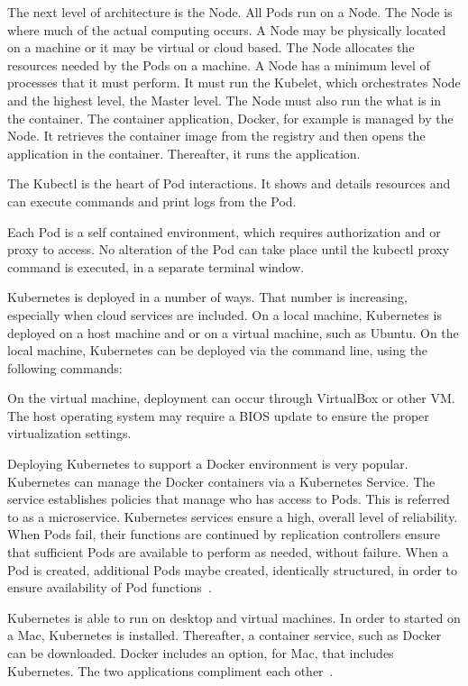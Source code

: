 The next level of architecture is the Node.  All Pods run on a Node.
The Node is where much of the actual computing occurs.  A Node may be
physically located on a machine or it may be virtual or cloud
based. The Node allocates the resources needed by the Pods on a
machine.  A Node has a minimum level of processes that it must
perform.  It must run the Kubelet, which orchestrates Node and the
highest level, the Master level.  The Node must also run the what is
in the container.  The container application, Docker, for example is
managed by the Node.  It retrieves the container image from the
registry and then opens the application in the container.  Thereafter,
it runs the application. 

The Kubectl is the heart of Pod interactions.  It shows and details
resources and can execute commands and print logs from the Pod. 

Each Pod is a self contained environment, which requires authorization
and or proxy to access.  No alteration of the Pod can take place until
the kubectl proxy command is executed, in a separate terminal window.   
 


Kubernetes is deployed in a number of ways.  That number is
increasing, especially when cloud services are included.  On a local
machine, Kubernetes is deployed on a host machine and or on a virtual
machine, such as Ubuntu.  On the local machine, Kubernetes can be
deployed via the command line, using the following commands: 


On the virtual machine, deployment can occur through VirtualBox or
other VM.  The host operating system may require a BIOS update to
ensure the proper virtualization settings.   

Deploying Kubernetes to support a Docker environment is very popular.
Kubernetes can manage the Docker containers via a Kubernetes Service.
The service establishes policies that manage who has access to Pods.
This is referred to as a microservice.  Kubernetes services ensure a
high, overall level of reliability.  When Pods fail, their functions
are continued by replication controllers ensure that sufficient Pods
are available to perform as needed, without failure.  When a Pod is
created, additional Pods maybe created, identically structured, in
order to ensure availability of Pod functions~\cite{hid-sp18-525-service}.  



Kubernetes is able to run on desktop and virtual machines.  In order
to started on a Mac, Kubernetes is installed.  Thereafter, a container
service, such as Docker can be downloaded.  Docker includes an option,
for Mac, that includes Kubernetes.  The two applications compliment
each other~\cite{hid-sp18-525-service}.  

